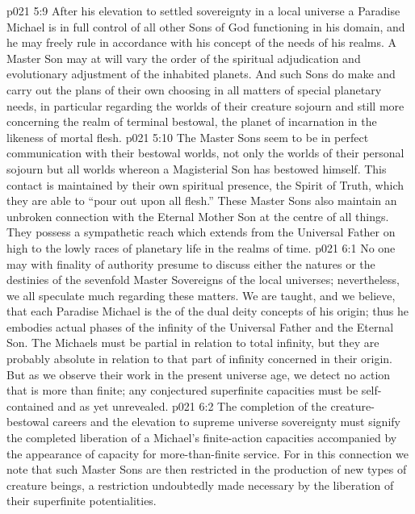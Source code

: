 \vs p021 5:9 After his elevation to settled sovereignty in a local universe a Paradise Michael is in full control of all other Sons of God functioning in his domain, and he may freely rule in accordance with his concept of the needs of his realms. A Master Son may at will vary the order of the spiritual adjudication and evolutionary adjustment of the inhabited planets. And such Sons do make and carry out the plans of their own choosing in all matters of special planetary needs, in particular regarding the worlds of their creature sojourn and still more concerning the realm of terminal bestowal, the planet of incarnation in the likeness of mortal flesh.
\vs p021 5:10 The Master Sons seem to be in perfect communication with their bestowal worlds, not only the worlds of their personal sojourn but all worlds whereon a Magisterial Son has bestowed himself. This contact is maintained by their own spiritual presence, the Spirit of Truth, which they are able to “pour out upon all flesh.” These Master Sons also maintain an unbroken connection with the Eternal Mother Son at the centre of all things. They possess a sympathetic reach which extends from the Universal Father on high to the lowly races of planetary life in the realms of time.
\vs p021 6:1 No one may with finality of authority presume to discuss either the natures or the destinies of the sevenfold Master Sovereigns of the local universes; nevertheless, we all speculate much regarding these matters. We are taught, and we believe, that each Paradise Michael is the  of the dual deity concepts of his origin; thus he embodies actual phases of the infinity of the Universal Father and the Eternal Son. The Michaels must be partial in relation to total infinity, but they are probably absolute in relation to that part of infinity concerned in their origin. But as we observe their work in the present universe age, we detect no action that is more than finite; any conjectured superfinite capacities must be self\hyp{}contained and as yet unrevealed.
\vs p021 6:2 The completion of the creature\hyp{}bestowal careers and the elevation to supreme universe sovereignty must signify the completed liberation of a Michael’s finite\hyp{}action capacities accompanied by the appearance of capacity for more\hyp{}than\hyp{}finite service. For in this connection we note that such Master Sons are then restricted in the production of new types of creature beings, a restriction undoubtedly made necessary by the liberation of their superfinite potentialities.
